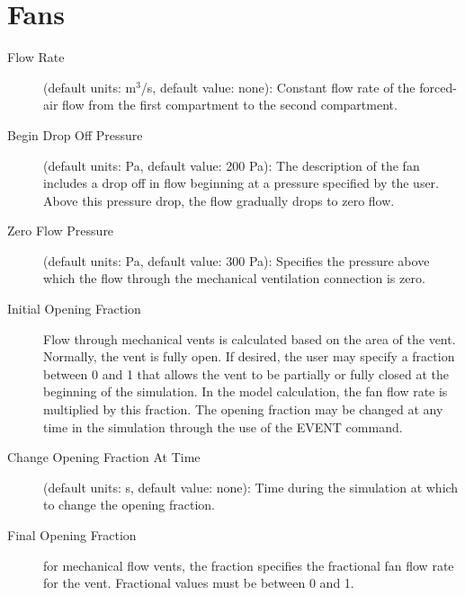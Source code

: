 \section{Fans}

\begin{description}
\item[Flow Rate] (default units: m$^3$/s, default value: none): Constant flow rate of the forced-air flow from the first compartment to the second compartment.

\item[Begin Drop Off Pressure] (default units: Pa, default value: 200 Pa): The description of the fan includes a drop off in flow beginning at a pressure specified by the user.  Above this pressure drop, the flow gradually drops to zero flow.

\item[Zero Flow Pressure] (default units: Pa, default value: 300 Pa): Specifies the pressure above which the flow through the mechanical ventilation connection is zero.

\item[Initial Opening Fraction] Flow through mechanical vents is calculated based on the area of the vent.  Normally, the vent is fully open.  If desired, the user may specify a fraction between 0 and 1 that allows the vent to be partially or fully closed at the beginning of the simulation.  In the model calculation, the fan flow rate is multiplied by this fraction.  The opening fraction may be changed at any time in the simulation through the use of the EVENT command.

\item[Change Opening Fraction At Time] (default units: s, default value: none): Time during the simulation at which to change the opening fraction.

\item[Final Opening Fraction] for mechanical flow vents, the fraction specifies the fractional fan flow rate for the vent. Fractional values must be between 0 and 1.
\end{description}


